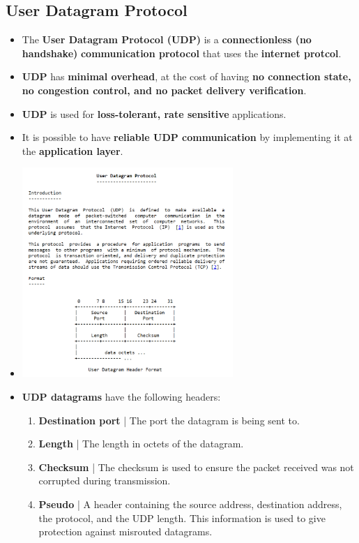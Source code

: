 \documentclass[16pt]{article}
\begin{document}
    \subsection*{User Datagram Protocol}
    \begin{itemize}
        \item The \textbf{User Datagram Protocol (UDP)} is a \textbf{connectionless (no handshake)} \textbf{communication protocol} that uses the \textbf{internet protcol}.
        \item \textbf{UDP} has \textbf{minimal overhead}, at the cost of having \textbf{no connection state, no congestion control, and no packet delivery verification}.
        \item \textbf{UDP} is used for \textbf{loss-tolerant, rate sensitive} applications.
        \item It is possible to have \textbf{reliable UDP communication} by implementing it at the \textbf{application layer}.
        \item[] \begin{center}
                    \includegraphics[height=300px]{images/UDP.PNG}
                \end{center}
        \item \textbf{UDP datagrams} have the following headers:
        \begin{enumerate}
            \item \textbf{Destination port} | The port the datagram is being sent to.
            \item \textbf{Length} | The length in octets of the datagram.
            \item \textbf{Checksum} | The checksum is used to ensure the packet received was not corrupted during transmission.
            \item \textbf{Pseudo} | A header containing the source address, destination address, the protocol, and the UDP length. This information is used to give protection against misrouted datagrams.

\end{enumerate}
\end{itemize}
\end{document}
